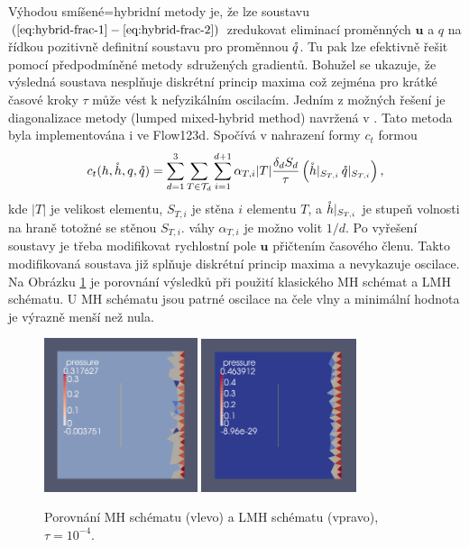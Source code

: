 \documentclass[11pt]{report}
\def\abs#1{\lvert#1\rvert}
\def\vc#1{\mathbf{\boldsymbol{#1}}}     %
\begin{document}
Výhodou smíšené=hybridní metody je, že lze soustavu $(\ref{eq:hybrid-frac-1} - 
\ref{eq:hybrid-frac-2})$ zredukovat eliminací proměnných $\vc u$ a $q$ na 
řídkou pozitivně definitní soustavu pro proměnnou $\mathring q$. Tu pak lze efektivně 
řešit pomocí předpodmíněné metody sdružených gradientů. Bohužel se ukazuje, že 
výsledná soustava nesplňuje diskrétní princip maxima což zejména pro krátké 
časové kroky $\tau$ může vést k nefyzikálním oscilacím. Jedním z možných řešení 
je diagonalizace metody (lumped mixed-hybrid method) navržená v 
\cite{younes_2006}. Tato metoda byla implementována i ve Flow123d. 
Spočívá v nahrazení formy $c_t$ formou
\[
    c_t(h, \mr h, q, \mr q)= \sum_{d=1}^{3}\sum_{T\in \mathcal T_d}
        \sum_{i=1}^{d+1} \alpha_{T,i} \abs{T} \frac{\delta_d S_d}{\tau} 
        \left(\mr h|_{S_{T,i}}\,  \mr q|_{S_{T,i}}\right),
\]
kde $\abs{T}$ je velikost elementu, $S_{T,i}$ je stěna $i$ elementu $T$, a 
$\mathring h|_{S_{T,i}}$ je stupeň volnosti na hraně totožné se stěnou $S_{T,i}$. 
váhy $\alpha_{T,i}$ je možno volit $1/d$. 
Po vyřešení soustavy je třeba modifikovat rychlostní pole $\vc u$ přičtením 
časového členu. Takto modifikovaná soustava již splňuje diskrétní princip 
maxima a nevykazuje oscilace. Na Obrázku \ref{fig:LMH} je porovnání výsledků 
při použití klasického MH schémat a LMH schématu. U MH schématu jsou patrné 
oscilace na čele vlny a minimální hodnota je výrazně menší než nula. 

\begin{figure}
    \begin{center}
       \includegraphics[width=0.4\textwidth]{MH.png}
       \includegraphics[width=0.405\textwidth]{LMH.png}        
    \end{center}
    \caption{Porovnání MH schématu (vlevo) a LMH schématu (vpravo), 
$\tau=10^{-4}$.}
    \label{fig:LMH}
\end{figure}
\end{document}
